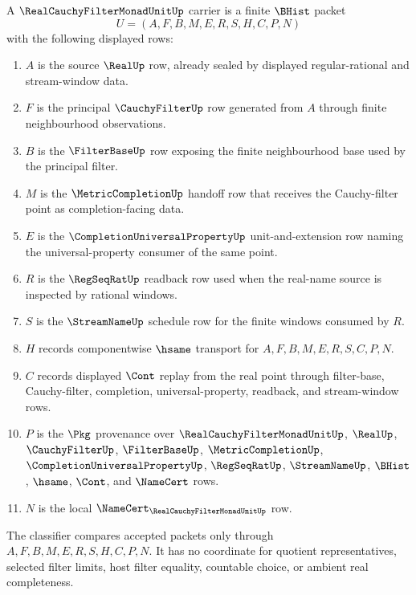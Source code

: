 \begin{definition}
\label{def:real-cauchy-filter-monad-unit-carrier}
A $\RealCauchyFilterMonadUnitUp$ carrier is a finite $\BHist$ packet
$$
U=(A,F,B,M,E,R,S,H,C,P,N)
$$
with the following displayed rows:
\begin{enumerate}
\item $A$ is the source $\RealUp$ row, already sealed by displayed regular-rational and stream-window data.
\item $F$ is the principal $\CauchyFilterUp$ row generated from $A$ through finite neighbourhood observations.
\item $B$ is the $\FilterBaseUp$ row exposing the finite neighbourhood base used by the principal filter.
\item $M$ is the $\MetricCompletionUp$ handoff row that receives the Cauchy-filter point as completion-facing data.
\item $E$ is the $\CompletionUniversalPropertyUp$ unit-and-extension row naming the universal-property consumer of the same point.
\item $R$ is the $\RegSeqRatUp$ readback row used when the real-name source is inspected by rational windows.
\item $S$ is the $\StreamNameUp$ schedule row for the finite windows consumed by $R$.
\item $H$ records componentwise $\hsame$ transport for $A,F,B,M,E,R,S,C,P,N$.
\item $C$ records displayed $\Cont$ replay from the real point through filter-base, Cauchy-filter, completion, universal-property, readback, and stream-window rows.
\item $P$ is the $\Pkg$ provenance over $\RealCauchyFilterMonadUnitUp$, $\RealUp$, $\CauchyFilterUp$, $\FilterBaseUp$, $\MetricCompletionUp$, $\CompletionUniversalPropertyUp$, $\RegSeqRatUp$, $\StreamNameUp$, $\BHist$, $\hsame$, $\Cont$, and $\NameCert$ rows.
\item $N$ is the local $\NameCert_{\RealCauchyFilterMonadUnitUp}$ row.
\end{enumerate}
The classifier compares accepted packets only through $A,F,B,M,E,R,S,H,C,P,N$. It has no coordinate for quotient representatives, selected filter limits, host filter equality, countable choice, or ambient real completeness.
\end{definition}

